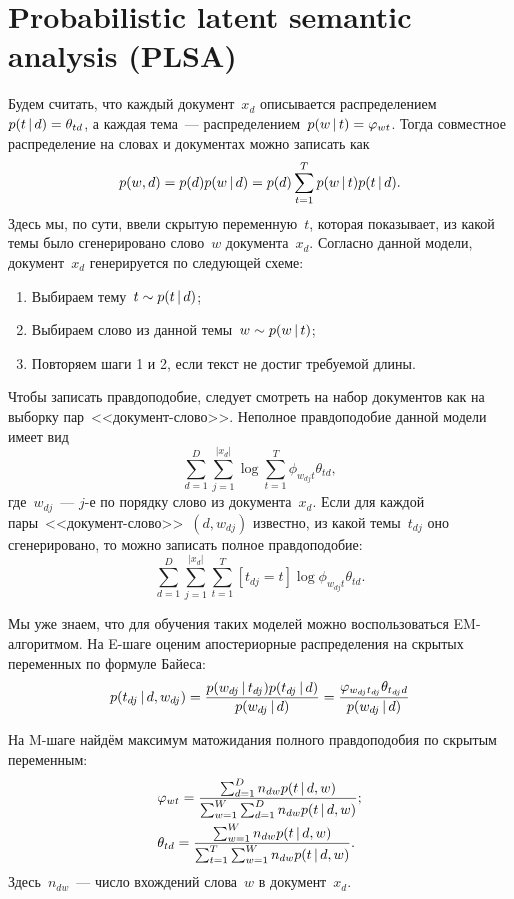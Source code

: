 \documentclass[12pt,fleqn]{article}
\begin{document}
\section{Probabilistic latent semantic analysis (PLSA)}

Будем считать, что каждый документ~$x_d$ описывается распределением~$p(t \mspace{3mu}{|}\mspace{3mu} d) = \theta_{td}$,
а каждая тема~--- распределением~$p(w \mspace{3mu}{|}\mspace{3mu} t) = \varphi_{wt}$.
Тогда совместное распределение на словах и документах можно записать как
\[
    p(w, d)
    =
    p(d) p(w \mspace{3mu}{|}\mspace{3mu} d)
    =
    p(d)
    \sum_{t = 1}^{T}
        p(w \mspace{3mu}{|}\mspace{3mu} t) p(t \mspace{3mu}{|}\mspace{3mu} d).
\]
Здесь мы, по сути, ввели скрытую переменную~$t$, которая показывает,
из какой темы было сгенерировано слово~$w$ документа~$x_d$.
Согласно данной модели, документ~$x_d$ генерируется по следующей схеме:
\begin{enumerate}
    \item Выбираем тему~$t \sim p(t \mspace{3mu}{|}\mspace{3mu} d)$;
    \item Выбираем слово из данной темы~$w \sim p(w \mspace{3mu}{|}\mspace{3mu} t)$;
    \item Повторяем шаги 1 и 2, если текст не достиг требуемой длины.
\end{enumerate}

Чтобы записать правдоподобие, следует смотреть на набор документов
как на выборку пар~<<документ-слово>>.
Неполное правдоподобие данной модели имеет вид
\[
    \sum_{d = 1}^{D}
    \sum_{j = 1}^{|x_d|}
        \log \sum_{t = 1}^{T} \phi_{w_{dj}t} \theta_{td},
\]
где~$w_{dj}$~--- $j$-е по порядку слово из документа~$x_d$.
Если для каждой пары~<<документ-слово>>~$(d, w_{dj})$ известно,
из какой темы~$t_{dj}$ оно сгенерировано, то можно записать полное правдоподобие:
\[
    \sum_{d = 1}^{D}
    \sum_{j = 1}^{|x_d|}
    \sum_{t = 1}^{T}
        [t_{dj} = t]
        \log \phi_{w_{dj}t} \theta_{td}.
\]

Мы уже знаем, что для обучения таких моделей можно воспользоваться EM-алгоритмом.
На E-шаге оценим апостериорные распределения на скрытых переменных по формуле Байеса:
\[
    p(t_{dj} \mspace{3mu}{|}\mspace{3mu} d, w_{dj})
    =
    \frac{
        p(w_{dj} \mspace{3mu}{|}\mspace{3mu} t_{dj}) p(t_{dj} \mspace{3mu}{|}\mspace{3mu} d)
    }{
        p(w_{dj} \mspace{3mu}{|}\mspace{3mu} d)
    }
    =
    \frac{
        \varphi_{w_{dj}t_{dj}} \theta_{t_{dj} d}
    }{
        p(w_{dj} \mspace{3mu}{|}\mspace{3mu} d)
    }
\]

На M-шаге найдём максимум матожидания полного правдоподобия по скрытым переменным:
\begin{align*}
    &\varphi_{wt}
    =
    \frac{
        \sum_{d = 1}^{D}
            n_{dw} p(t \mspace{3mu}{|}\mspace{3mu} d, w)
    }{
        \sum_{w = 1}^{W}
        \sum_{d = 1}^{D}
            n_{dw} p(t \mspace{3mu}{|}\mspace{3mu} d, w)
    };\\
    &\theta_{td}
    =
    \frac{
        \sum_{w = 1}^{W}
            n_{dw} p(t \mspace{3mu}{|}\mspace{3mu} d, w)
    }{
        \sum_{t = 1}^{T}
        \sum_{w = 1}^{W}
            n_{dw} p(t \mspace{3mu}{|}\mspace{3mu} d, w)
    }.
\end{align*}
Здесь~$n_{dw}$~--- число вхождений слова~$w$ в документ~$x_d$.
\end{document}

